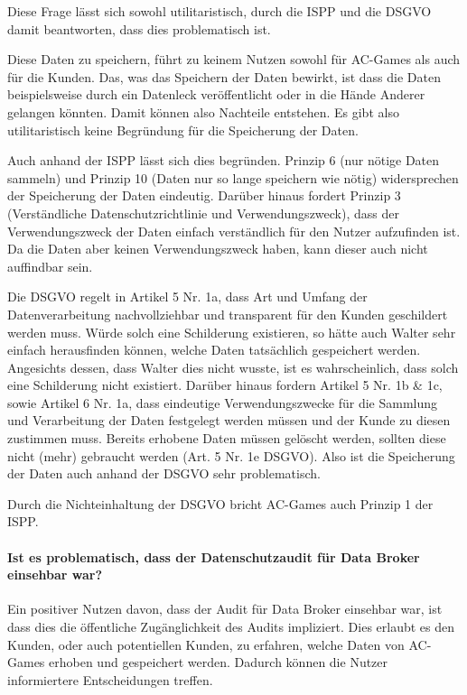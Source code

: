 Diese Frage lässt sich sowohl utilitaristisch, durch die ISPP und die DSGVO damit beantworten, dass dies problematisch ist.

Diese Daten zu speichern, führt zu keinem Nutzen sowohl für AC-Games als auch für die Kunden.
Das, was das Speichern der Daten bewirkt, ist dass die Daten beispielsweise durch ein Datenleck veröffentlicht oder in die Hände Anderer gelangen könnten.
Damit können also Nachteile entstehen.
Es gibt also utilitaristisch keine Begründung für die Speicherung der Daten.

Auch anhand der ISPP lässt sich dies begründen. Prinzip 6 (nur nötige Daten sammeln) und Prinzip 10 (Daten nur so lange speichern wie nötig) widersprechen der Speicherung der Daten eindeutig.
Darüber hinaus fordert Prinzip 3 (Verständliche Datenschutzrichtlinie und Verwendungszweck), dass der Verwendungszweck der Daten einfach verständlich für den Nutzer aufzufinden ist.
Da die Daten aber keinen Verwendungszweck haben, kann dieser auch nicht auffindbar sein.  

Die DSGVO regelt in Artikel 5 Nr. 1a, dass Art und Umfang der Datenverarbeitung nachvollziehbar und transparent für den Kunden geschildert werden muss.
Würde solch eine Schilderung existieren, so hätte auch Walter sehr einfach herausfinden können, welche Daten tatsächlich gespeichert werden.
Angesichts dessen, dass Walter dies nicht wusste, ist es wahrscheinlich, dass solch eine Schilderung nicht existiert.
Darüber hinaus fordern Artikel 5 Nr. 1b \& 1c, sowie Artikel 6 Nr. 1a, dass eindeutige Verwendungszwecke für die Sammlung und Verarbeitung der Daten festgelegt werden müssen und der Kunde zu diesen zustimmen muss.
Bereits erhobene Daten müssen gelöscht werden, sollten diese nicht (mehr) gebraucht werden (Art. 5 Nr. 1e DSGVO).
Also ist die Speicherung der Daten auch anhand der DSGVO sehr problematisch.

Durch die Nichteinhaltung der DSGVO bricht AC-Games auch Prinzip 1 der ISPP.

\paragraph*{Ist es problematisch, dass der Datenschutzaudit für Data Broker einsehbar war? \cite{kees_faites_2017}}

Ein positiver Nutzen davon, dass der Audit für Data Broker einsehbar war, ist dass dies die öffentliche Zugänglichkeit des Audits impliziert.
Dies erlaubt es den Kunden, oder auch potentiellen Kunden, zu erfahren, welche Daten von AC-Games erhoben und gespeichert werden. Dadurch können die Nutzer informiertere Entscheidungen treffen.

